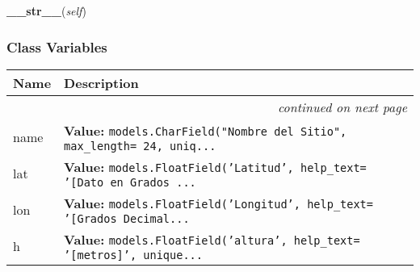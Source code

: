     \label{GroundSegment:models:Sitio:Sitio:__str__}

    \vspace{0.5ex}

\hspace{.8\funcindent}\begin{boxedminipage}{\funcwidth}

    \raggedright \textbf{\_\_str\_\_}(\textit{self})

\setlength{\parskip}{2ex}
\setlength{\parskip}{1ex}
    \end{boxedminipage}



  \subsubsection{Class Variables}

    \vspace{-1cm}
\hspace{\varindent}\begin{longtable}{|p{\varnamewidth}|p{\vardescrwidth}|l}
\cline{1-2}
\cline{1-2} \centering \textbf{Name} & \centering \textbf{Description}& \\
\cline{1-2}
\endhead\cline{1-2}\multicolumn{3}{r}{\small\textit{continued on next page}}\\\endfoot\cline{1-2}
\endlastfoot\raggedright n\-a\-m\-e\- & \raggedright \textbf{Value:} 
{\tt models.CharField("Nombre del Sitio", max\_length= 24, uniq\texttt{...}}&\\
\cline{1-2}
\raggedright l\-a\-t\- & \raggedright \textbf{Value:} 
{\tt models.FloatField('Latitud', help\_text= '[Dato en Grados \texttt{...}}&\\
\cline{1-2}
\raggedright l\-o\-n\- & \raggedright \textbf{Value:} 
{\tt models.FloatField('Longitud', help\_text= '[Grados Decimal\texttt{...}}&\\
\cline{1-2}
\raggedright h\- & \raggedright \textbf{Value:} 
{\tt models.FloatField('altura', help\_text= '[metros]', unique\texttt{...}}&\\
\cline{1-2}
\end{longtable}

